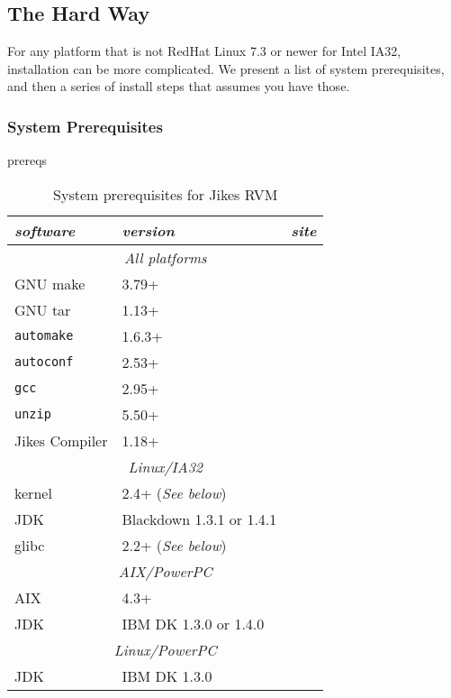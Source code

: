 \subsection{The Hard Way}

 For any platform that is not RedHat Linux 7.3 or newer for Intel
IA32, installation can be more complicated.  We present a list of system
prerequisites, and then a series of install steps that assumes you
have those.

\subsubsection{System Prerequisites}

\begin{Label}{prereqs}

\begin{table}[h]
\begin{center}
\begin{tabular}{|l|l|l|} \hline\hline
{\em software} & {\em version} & {\em site} \\ \hline
\multicolumn{3}{|c|}{\em All platforms}                     \\ \hline
GNU make       & 3.79+    & \xlink{\tt \makeURL}{\makeURL}         \\ 
GNU tar        & 1.13+    & \xlink{\tt \tarURL}{\tarURL}           \\ 
{\tt automake}       & 1.6.3+   & \xlink{\tt \automakeURL}{\automakeURL} \\
{\tt autoconf}       & 2.53+    & \xlink{\tt \autoconfURL}{\autoconfURL} \\
{\tt gcc}            & 2.95+    & \xlink{\tt \gccURL}{\gccURL}           \\
{\tt unzip}          & 5.50+    & \xlink{\tt \unzipURL}{\unzipURL}       \\
Jikes Compiler & 1.18+    & \xlink{\tt \jikesURL}{\jikesURL}       \\
\hline
\multicolumn{3}{|c|}{\em Linux/IA32}                      \\ \hline
kernel         & 2.4+ ({\em See below}) & \xlink{\tt \linuxKernelURL}{\linuxKernelURL} \\
JDK            & Blackdown 1.3.1 or 1.4.1 & \xlink{\tt \BlackdownURL}{\BlackdownURL} \\
glibc          & 2.2+ ({\em See below}) & \xlink{\tt \glibcURL}{\glibcURL} \\ \hline
\multicolumn{3}{|c|}{\em AIX/PowerPC}                     \\ \hline
AIX            & 4.3+     &                          \\
JDK            & IBM DK 1.3.0 or 1.4.0 & \xlink{\tt \AIXJdkURL}{\AIXJdkURL} \\ \hline
\multicolumn{3}{|c|}{\em Linux/PowerPC}                      \\ \hline
JDK            & IBM DK 1.3.0    & \xlink{\tt \linuxPPCJDKURL}{\linuxPPCJDKURL} \\
\hline\hline 
\end{tabular}
\end{center}
\caption{System prerequisites for Jikes RVM}
\end{table}
\end{Label}

